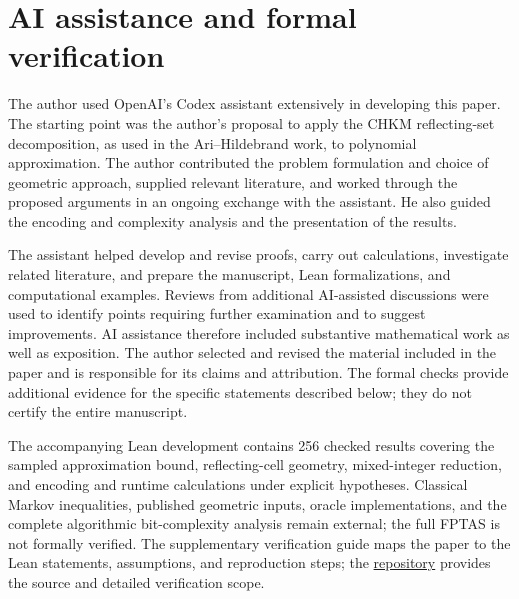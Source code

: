 \documentclass[final,5p,times,twocolumn]{elsarticle}
\theoremstyle{definition}\newtheorem{definition}{Definition}[section]
\theoremstyle{remark}\newtheorem{remark}[theorem]{Remark}
\begin{document}
\section*{AI assistance and formal verification}
The author used OpenAI's Codex assistant extensively in developing this paper. The starting point was the author's proposal to apply the CHKM reflecting-set decomposition, as used in the Ari--Hildebrand work, to polynomial approximation. The author contributed the problem formulation and choice of geometric approach, supplied relevant literature, and worked through the proposed arguments in an ongoing exchange with the assistant. He also guided the encoding and complexity analysis and the presentation of the results.

The assistant helped develop and revise proofs, carry out calculations, investigate related literature, and prepare the manuscript, Lean formalizations, and computational examples. Reviews from additional AI-assisted discussions were used to identify points requiring further examination and to suggest improvements. AI assistance therefore included substantive mathematical work as well as exposition. The author selected and revised the material included in the paper and is responsible for its claims and attribution. The formal checks provide additional evidence for the specific statements described below; they do not certify the entire manuscript.

The accompanying Lean development contains 256 checked results covering the sampled approximation bound, reflecting-cell geometry, mixed-integer reduction, and encoding and runtime calculations under explicit hypotheses. Classical Markov inequalities, published geometric inputs, oracle implementations, and the complete algorithmic bit-complexity analysis remain external; the full FPTAS is not formally verified. The supplementary verification guide maps the paper to the Lean statements, assumptions, and reproduction steps; the \href{https://github.com/RobertHildebrand/FPTAS-Polynomial-Optimization/tree/main/verification}{repository} provides the source and detailed verification scope.
\end{document}
